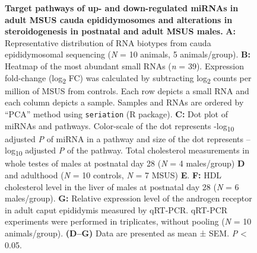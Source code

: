 \documentclass[12pt,twoside]{reedthesis}
\begin{document}
\begin{figure}[htbp]
\caption[Target pathways of up- and down-regulated miRNAs in adult MSUS cauda epididymosomes and alterations in steroidogenesis in postnatal and adult MSUS males]{\textbf{Target pathways of up- and down-regulated miRNAs in adult MSUS cauda epididymosomes and alterations in steroidogenesis in postnatal and adult MSUS males.} \newline \textbf{A:} Representative distribution of RNA biotypes from cauda epididymosomal sequencing (\emph{N} = 10 animals, 5 animals/group). \newline \textbf{B:} Heatmap of the most abundant small RNAs (\emph{n} = 39). Expression fold-change (log\textsubscript{2} FC) was calculated by subtracting log\textsubscript{2} counts per million of MSUS from controls. Each row depicts a small RNA and each column depicts a sample. Samples and RNAs are ordered by ``PCA'' method using \texttt{seriation} (R package). \newline \textbf{C:} Dot plot of miRNAs and pathways. Color-scale of the dot represents -log\textsubscript{10} adjusted \emph{P} of miRNA in a pathway and size of the dot represents --log\textsubscript{10} adjusted \emph{P} of the pathway. \newline Total cholesterol measurements in whole testes of males at postnatal day 28 (\emph{N} = 4 males/group) \textbf{D} and adulthood (\emph{N} = 10 controls, \emph{N} = 7 MSUS) \textbf{E}. \textbf{F:} HDL cholesterol level in the liver of males at postnatal day 28 (\emph{N} = 6 males/group). \newline \textbf{G:} Relative expression level of the androgen receptor in adult caput epididymis measured by qRT-PCR. qRT-PCR experiments were performed in triplicates, without pooling (\emph{N} = 10 animals/group). \newline \textbf{(D–G)} Data are presented as mean ± SEM. \emph{P} \textless{} 0.05.}\label{fig:ef3}
\end{figure}
\end{document}
